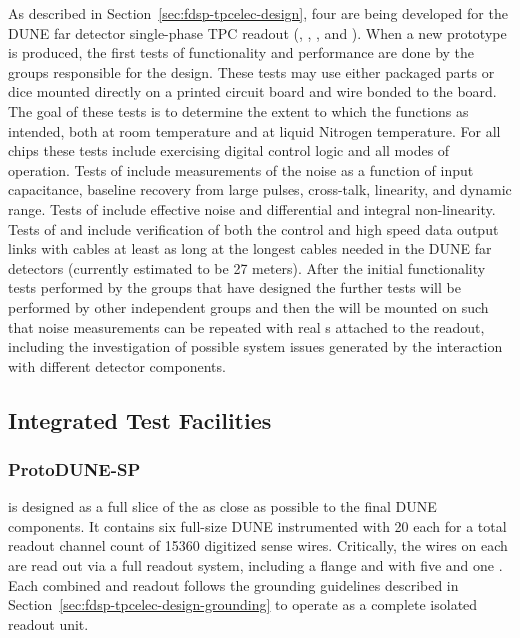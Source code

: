 As described in Section~\ref{sec:fdsp-tpcelec-design}, four  
are being developed for the DUNE far detector single-phase TPC readout 
(, , , and ). 
When a new prototype  is produced, the first tests of 
 functionality and performance are done by the groups 
responsible for the  design. These tests may use either 
packaged parts or dice mounted directly on a printed circuit board 
and wire bonded to the board.  The goal of these tests is to determine 
the extent to which the  functions as intended, both at room 
temperature and at liquid Nitrogen temperature.  For all chips these tests 
include exercising digital control logic and all modes of operation. Tests 
of   include measurements of the noise as a function 
of input capacitance, baseline recovery from large pulses, cross-talk, linearity, 
and dynamic range. Tests of  include effective noise and 
differential and integral non-linearity. Tests of  and  
include verification of both the control and high speed data output links with 
cables at least as long at the longest cables needed in the DUNE far detectors 
(currently estimated to be 27 meters). After the initial functionality
tests performed by the groups that have designed the  further
tests will be performed by other independent groups and then the 
will be mounted on  such that noise measurements can be repeated
with real s attached to the readout, including the investigation
of possible system issues generated by the interaction with different 
detector components.

\subsection{Integrated Test Facilities}
\label{sec:fdsp-tpcelec-qa-facilities}

\subsubsection{ProtoDUNE-SP}
\label{sec:fdsp-tpcelec-qa-facilities-pdune}

 is designed as a full slice of the  as close as 
possible to the final DUNE \single components. It contains six full-size 
DUNE  instrumented with \num{20}  each for a 
total readout channel count of \num{15360} digitized sense wires. Critically, 
the wires on each  are read out via a full  readout 
system, including a  flange and  with five  
and one . Each combined  and  readout follows 
the grounding guidelines described in Section~\ref{sec:fdsp-tpcelec-design-grounding} 
to operate as a complete isolated readout unit.

